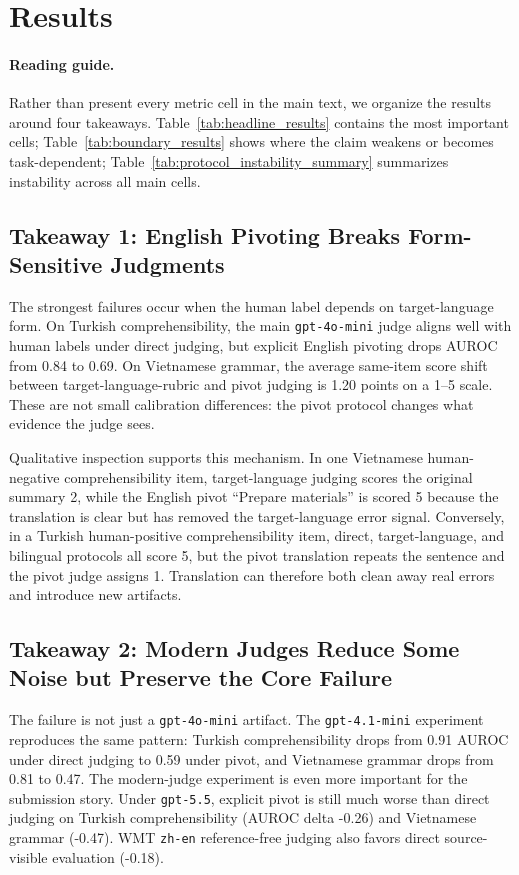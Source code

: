 \documentclass{article}
\begin{document}
\section{Results}

\paragraph{Reading guide.}
Rather than present every metric cell in the main text, we organize the results around four takeaways. Table~\ref{tab:headline_results} contains the most important cells; Table~\ref{tab:boundary_results} shows where the claim weakens or becomes task-dependent; Table~\ref{tab:protocol_instability_summary} summarizes instability across all main cells.

\subsection{Takeaway 1: English Pivoting Breaks Form-Sensitive Judgments}

The strongest failures occur when the human label depends on target-language form. On Turkish comprehensibility, the main \texttt{gpt-4o-mini} judge aligns well with human labels under direct judging, but explicit English pivoting drops AUROC from 0.84 to 0.69. On Vietnamese grammar, the average same-item score shift between target-language-rubric and pivot judging is 1.20 points on a 1--5 scale. These are not small calibration differences: the pivot protocol changes what evidence the judge sees.

Qualitative inspection supports this mechanism. In one Vietnamese human-negative comprehensibility item, target-language judging scores the original summary 2, while the English pivot ``Prepare materials'' is scored 5 because the translation is clear but has removed the target-language error signal. Conversely, in a Turkish human-positive comprehensibility item, direct, target-language, and bilingual protocols all score 5, but the pivot translation repeats the sentence and the pivot judge assigns 1. Translation can therefore both clean away real errors and introduce new artifacts.

\subsection{Takeaway 2: Modern Judges Reduce Some Noise but Preserve the Core Failure}

The failure is not just a \texttt{gpt-4o-mini} artifact. The \texttt{gpt-4.1-mini} experiment reproduces the same pattern: Turkish comprehensibility drops from 0.91 AUROC under direct judging to 0.59 under pivot, and Vietnamese grammar drops from 0.81 to 0.47. The modern-judge experiment is even more important for the submission story. Under \texttt{gpt-5.5}, explicit pivot is still much worse than direct judging on Turkish comprehensibility (AUROC delta -0.26) and Vietnamese grammar (-0.47). WMT \texttt{zh-en} reference-free judging also favors direct source-visible evaluation (-0.18).
\end{document}
